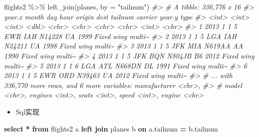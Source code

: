 \documentclass[
]{book}
\newenvironment{Shaded}{\begin{snugshade}}{\end{snugshade}}
\newcommand{\AttributeTok}[1]{\textcolor[rgb]{0.77,0.63,0.00}{#1}}
\newcommand{\CommentTok}[1]{\textcolor[rgb]{0.56,0.35,0.01}{\textit{#1}}}
\newcommand{\FunctionTok}[1]{\textcolor[rgb]{0.00,0.00,0.00}{#1}}
\newcommand{\KeywordTok}[1]{\textcolor[rgb]{0.13,0.29,0.53}{\textbf{#1}}}
\newcommand{\NormalTok}[1]{#1}
\newcommand{\OperatorTok}[1]{\textcolor[rgb]{0.81,0.36,0.00}{\textbf{#1}}}
\newcommand{\SpecialCharTok}[1]{\textcolor[rgb]{0.00,0.00,0.00}{#1}}
\newcommand{\StringTok}[1]{\textcolor[rgb]{0.31,0.60,0.02}{#1}}
\providecommand{\tightlist}{%
  \setlength{\itemsep}{0pt}\setlength{\parskip}{0pt}}
\begin{document}
\begin{Shaded}
\begin{Highlighting}[]
\NormalTok{flights2 }\SpecialCharTok{\%\textgreater{}\%} \FunctionTok{left\_join}\NormalTok{(planes, }\AttributeTok{by =} \StringTok{"tailnum"}\NormalTok{)}
\CommentTok{\#\textgreater{} \# A tibble: 336,776 x 16}
\CommentTok{\#\textgreater{}   year.x month   day  hour origin dest  tailnum carrier year.y type             }
\CommentTok{\#\textgreater{}    \textless{}int\textgreater{} \textless{}int\textgreater{} \textless{}int\textgreater{} \textless{}dbl\textgreater{} \textless{}chr\textgreater{}  \textless{}chr\textgreater{} \textless{}chr\textgreater{}   \textless{}chr\textgreater{}    \textless{}int\textgreater{} \textless{}chr\textgreater{}            }
\CommentTok{\#\textgreater{} 1   2013     1     1     5 EWR    IAH   N14228  UA        1999 Fixed wing multi\textasciitilde{}}
\CommentTok{\#\textgreater{} 2   2013     1     1     5 LGA    IAH   N24211  UA        1998 Fixed wing multi\textasciitilde{}}
\CommentTok{\#\textgreater{} 3   2013     1     1     5 JFK    MIA   N619AA  AA        1990 Fixed wing multi\textasciitilde{}}
\CommentTok{\#\textgreater{} 4   2013     1     1     5 JFK    BQN   N804JB  B6        2012 Fixed wing multi\textasciitilde{}}
\CommentTok{\#\textgreater{} 5   2013     1     1     6 LGA    ATL   N668DN  DL        1991 Fixed wing multi\textasciitilde{}}
\CommentTok{\#\textgreater{} 6   2013     1     1     5 EWR    ORD   N39463  UA        2012 Fixed wing multi\textasciitilde{}}
\CommentTok{\#\textgreater{} \# ... with 336,770 more rows, and 6 more variables: manufacturer \textless{}chr\textgreater{},}
\CommentTok{\#\textgreater{} \#   model \textless{}chr\textgreater{}, engines \textless{}int\textgreater{}, seats \textless{}int\textgreater{}, speed \textless{}int\textgreater{}, engine \textless{}chr\textgreater{}}
\end{Highlighting}
\end{Shaded}

\begin{itemize}
\tightlist
\item
  Sql实现
\end{itemize}

\begin{Shaded}
\begin{Highlighting}[]
\KeywordTok{select} \OperatorTok{*} \KeywordTok{from}\NormalTok{ flights2 a }\KeywordTok{left} \KeywordTok{join}\NormalTok{ planes b }\KeywordTok{on}\NormalTok{ a.tailnum }\OperatorTok{=}\NormalTok{ b.tailnum }
\end{Highlighting}
\end{Shaded}
\end{document}

